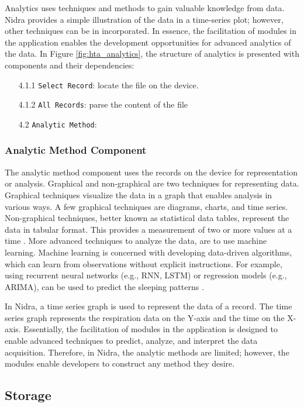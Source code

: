 Analytics uses techniques and methods to gain valuable knowledge from data. Nidra provides a simple illustration of the data in a time-series plot; however, other techniques can be in incorporated. In essence, the facilitation of modules in the application enables the development opportunities for advanced analytics of the data. In Figure \ref{fig:hta_analytics}, the structure of analytics is presented with components and their dependencies: 

\begin{itemize}
    \item[4.1.1] \verb|Select Record|: locate the file on the device.
    \item[4.1.2] \verb|All Records|: parse the content of the file 
    \item[4.2] \verb|Analytic Method|: 
\end{itemize}

\subsubsection{Analytic Method Component}
The analytic method component uses the records on the device for representation or analysis. Graphical and non-graphical are two techniques for representing data. Graphical techniques visualize the data in a graph that enables analysis in various ways. A few graphical techniques are diagrams, charts, and time series. Non-graphical techniques, better known as statistical data tables, represent the data in tabular format. This provides a measurement of two or more values at a time \cite{datarepresentation}. More advanced techniques to analyze the data, are to use machine learning. Machine learning is concerned with developing data-driven algorithms, which can learn from observations without explicit instructions. For example, using recurrent neural networks (e.g., RNN, LSTM) or regression models (e.g., ARIMA), can be used to predict the sleeping patterns \cite{machinelearning}.

In Nidra, a time series graph is used to represent the data of a record. The time series graph represents the respiration data on the Y-axis and the time on the X-axis. Essentially, the facilitation of modules in the application is designed to enable advanced techniques to predict, analyze, and interpret the data acquisition. Therefore, in Nidra, the analytic methods are limited; however, the modules enable developers to construct any method they desire. 

\subsection{Storage}


